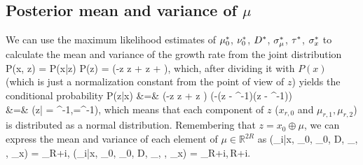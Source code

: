 \subsection{Posterior mean and variance of $\mu$}
We can use the maximum likelihood estimates of $\mu_0^\ast$, $\nu_0^\ast$, $D^\ast$, $\sigma_\mu^\ast$, $\tau^\ast$, $\sigma_x^\ast$ to calculate the mean and variance of the growth rate from the joint distribution
\be
	P(x, z) = P(x\;|\;z) P(z) = \exp\left(-z\T {} z + \T z + \right)\quad,
\ee
which, after dividing it with $P(x)$ (which is just a normalization constant from the point of view of $z$) yields the conditional probability
\ba
	P(z\;|\;x) &=&  \propto \exp\left(-z\T {} z + \T z \right) \propto \exp\left(-\Big(z - ^{-1}\Big)\T{}\Big(z - ^{-1}\Big)\right)
	\\
	&=&
	\Big(z\;\Big|\; = ^{-1},\;=^{-1}\Big)\quad,
\ea
which means that each component of $z$ ($x_{r,0}$ and $\mu_{r,1}, \mu_{r,2}$) is distributed as a normal distribution. Remembering that $z = x_0 \oplus \mu$, we can express the mean and variance of each element of $\mu \in \mathds{R}^{2R}$ as
\bel
	(\mu_i\;|\;x, \mu_0\s, \nu_0\s, D\s, \sigma_\mu\s, \tau\s, \sigma_x\s) = _{R+i}\quad,\qquad
	(\mu_i\;|\;x, \mu_0\s, \nu_0\s, D\s, \sigma_\mu\s, \tau\s, \sigma_x\s) = _{R+i,\,R+i}\quad.
\eel
